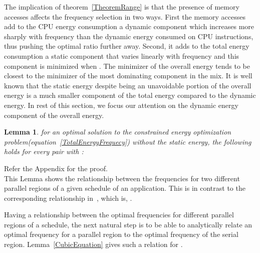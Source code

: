 \documentclass[11pt, letterpaper]{article}
\newtheorem{lemma}{Lemma}
\begin{document}
The implication of theorem~\ref{TheoremRange} is that the presence of memory accesses affects the frequency selection in two ways. First the memory accesses add to the CPU energy consumption a dynamic component which increases more sharply with frequency than the dynamic energy consumed on CPU instructions, thus pushing the optimal ratio further away. Second, it adds to the total energy consumption a static component that varies linearly with frequency and this component is minimized when . The minimizer of the overall energy tends to be closest to the minimizer of the most dominating component in the mix. It is well known that the static energy despite being an unavoidable portion of the overall energy is a much smaller component of the total energy compared to the dynamic energy.
In rest of this section, we focus our attention on the dynamic energy component of the overall energy.

\begin{lemma}\label{Relation}
for an optimal solution  to the constrained energy optimization problem(equation~\ref{TotalEnergyFrequecy}) without the static energy, the following holds for every pair  with :\\
 
\end{lemma}
 Refer the Appendix for the proof. \\
This Lemma shows the relationship between the frequencies for two different parallel regions of a given schedule of an application. This is in contrast to the corresponding relationship in~\cite{ConvexAndScheduling}, which is, . 


Having a relationship between the optimal frequencies for different parallel regions of a schedule, the next natural step is to be able to analytically relate an optimal frequency for a parallel region to the optimal frequency of the serial region.  Lemma~\ref{CubicEquation} gives such a relation for . 
\end{document}

